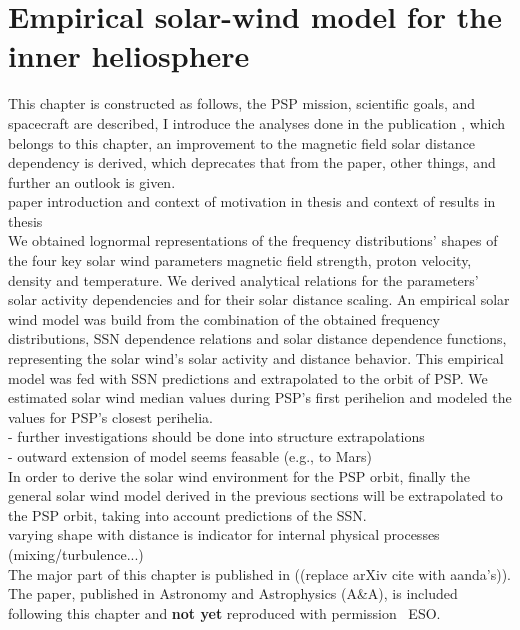 
\chapter{Empirical solar-wind model for the inner heliosphere}
\label{chap:empirical_solar_wind_model_for_the_inner_heliosphere}

This chapter is constructed as follows, the PSP mission, scientific goals, and spacecraft are described, I introduce the analyses done in the publication \citet{Venzmer2017}, which belongs to this chapter, an improvement to the magnetic field solar distance dependency is derived, which deprecates that from the paper, other things, and further an outlook is given.\\

paper introduction and context of motivation in thesis and context of results in thesis\\

We obtained lognormal representations of the frequency distributions’ shapes of the four key solar wind parameters magnetic field strength, proton velocity, density and temperature. We derived analytical relations for the parameters’ solar activity dependencies and for their solar distance scaling. An empirical solar wind model was build from the combination of the obtained frequency distributions, SSN dependence relations and solar distance dependence functions, representing the solar wind’s solar activity and distance behavior. This empirical model was fed with SSN predictions and extrapolated to the orbit of PSP. We estimated solar wind median values during PSP’s first perihelion and modeled the values for PSP’s closest perihelia.\\
- further investigations should be done into structure extrapolations\\
- outward extension of model seems feasable (e.g., to Mars)\\
In order to derive the solar wind environment for the PSP orbit, finally the general solar wind model derived in the previous sections will be extrapolated to the PSP orbit, taking into account predictions of the SSN.\\
varying shape with distance is indicator for internal physical processes (mixing/turbulence...)\\



The major part of this chapter is published in \citet{Venzmer2017} ((replace arXiv cite with aanda's)). The paper, published in Astronomy and Astrophysics (A\&A), is included following this chapter and \textbf{not yet} reproduced with permission \textcopyright~ESO.


